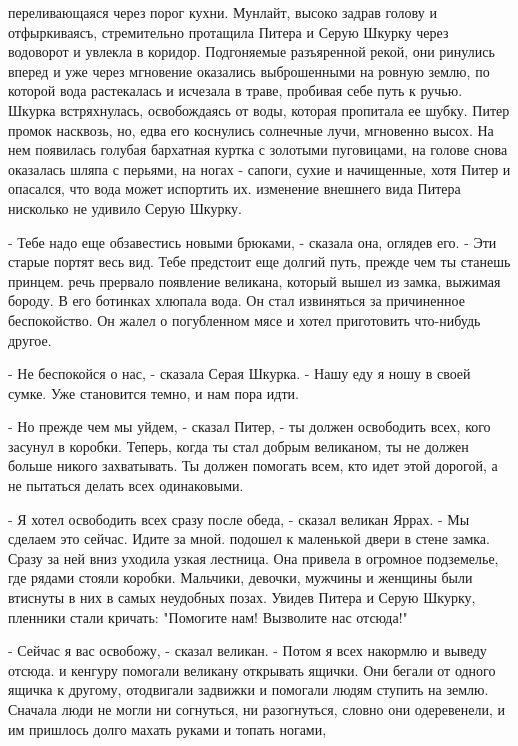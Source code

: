 переливающаяся через порог кухни. Мунлайт, высоко задрав голову и 
отфыркиваясъ, стремительно протащила Питера и Серую Шкурку через 
водоворот и увлекла в коридор. Подгоняемые разъяренной рекой, они 
ринулись вперед и уже через мгновение оказались выброшенными на ровную 
землю, по которой вода растекалась и исчезала в траве, пробивая себе 
путь к ручью.
 Шкурка встряхнулась, освобождаясь от воды, которая пропитала 
ее шубку. Питер промок насквозь, но, едва его коснулись солнечные 
лучи, мгновенно высох. На нем появилась голубая бархатная куртка с 
золотыми пуговицами, на голове снова оказалась шляпа с перьями, на 
ногах - сапоги, сухие и начищенные, хотя Питер и опасался, что вода 
может испортить их.
 изменение внешнего вида Питера нисколько не удивило Серую 
Шкурку.
\par- Тебе надо еще обзавестись новыми брюками, - сказала она, оглядев 
его. - Эти старые портят весь вид. Тебе предстоит еще долгий путь, 
прежде чем ты станешь принцем.
 речь прервало появление великана, который вышел из замка, 
выжимая бороду. В его ботинках хлюпала вода. Он стал извиняться за 
причиненное беспокойство. Он жалел о погубленном мясе и хотел 
приготовить что-нибудь другое.
\par- Не беспокойся о нас, - сказала Серая Шкурка. - Нашу еду я ношу в 
своей сумке. Уже становится темно, и нам пора идти.
\par- Но прежде чем мы уйдем, - сказал Питер, - ты должен освободить 
всех, кого засунул в коробки. Теперь, когда ты стал добрым великаном, 
ты не должен больше никого захватывать. Ты должен помогать всем, кто 
идет этой дорогой, а не пытаться делать всех одинаковыми.
\par- Я хотел освободить всех сразу после обеда, - сказал великан 
Яррах. - Мы сделаем это сейчас. Идите за мной.
 подошел к маленькой двери в стене замка. Сразу за ней вниз 
уходила узкая лестница. Она привела в огромное подземелье, где рядами 
стояли коробки. Мальчики, девочки, мужчины и женщины были втиснуты в 
них в самых неудобных позах. Увидев Питера и Серую Шкурку, пленники 
стали кричать: "Помогите нам! Вызволите нас отсюда!"
\par- Сейчас я вас освобожу, - сказал великан. - Потом я всех накормлю 
и выведу отсюда.
 и кенгуру помогали великану открывать ящички. Они бегали от 
одного ящичка к другому, отодвигали задвижки и помогали людям ступить 
на землю. Сначала люди не могли ни согнуться, ни разогнуться, словно 
они одеревенели, и им пришлось долго махать руками и топать ногами, 
